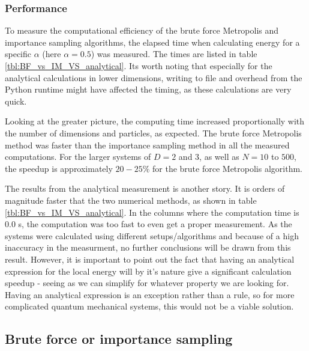 \documentclass[
]{article}
\begin{document}
\hypertarget{performance}{%
\subsubsection*{Performance}\label{performance}}

To measure the computational efficiency of the brute force Metropolis
and importance sampling algorithms, the elapsed time when calculating
energy for a specific \(\alpha\) (here \(\alpha = 0.5\)) was measured.
The times are listed in table \ref{tbl:BF_vs_IM_VS_analytical}. Its
worth noting that especially for the analytical calculations in lower
dimensions, writing to file and overhead from the Python runtime might
have affected the timing, as these calculations are very quick.

Looking at the greater picture, the computing time increased
proportionally with the number of dimensions and particles, as expected.
The brute force Metropolis method was faster than the importance
sampling method in all the measured computations. For the larger systems
of \(D = 2\) and \(3\), as well as \(N = 10\) to \(500\), the speedup is
approximately \(20- 25\%\) for the brute force Metropolis algorithm.

The results from the analytical measurement is another story. It is
orders of magnitude faster that the two numerical methods, as shown in
table \ref{tbl:BF_vs_IM_VS_analytical}. In the columns where the
computation time is \(0.0\) s, the computation was too fast to even get
a proper measurement. As the systems were calculated using different
setups/algorithms and because of a high inaccuracy in the measurment, no
further conclusions will be drawn from this result. However, it is
important to point out the fact that having an analytical expression for
the local energy will by it's nature give a significant calculation
speedup - seeing as we can simplify for whatever property we are looking
for. Having an analytical expression is an exception rather than a rule,
so for more complicated quantum mechanical systems, this would not be a
viable solution.

\hypertarget{brute-force-or-importance-sampling}{%
\subsection*{Brute force or importance
sampling}\label{brute-force-or-importance-sampling}}
\end{document}
